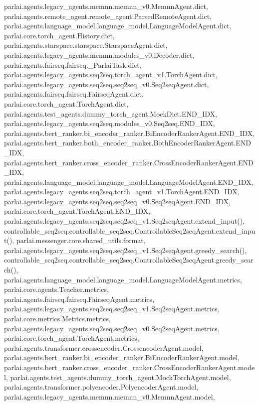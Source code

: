 parlai.\+agents.\+legacy\+\_\+agents.\+memnn.\+memnn\+\_\+v0.\+Memnn\+Agent.\+dict, parlai.\+agents.\+remote\+\_\+agent.\+remote\+\_\+agent.\+Parsed\+Remote\+Agent.\+dict, parlai.\+agents.\+language\+\_\+model.\+language\+\_\+model.\+Language\+Model\+Agent.\+dict, parlai.\+core.\+torch\+\_\+agent.\+History.\+dict, parlai.\+agents.\+starspace.\+starspace.\+Starspace\+Agent.\+dict, parlai.\+agents.\+legacy\+\_\+agents.\+memnn.\+modules\+\_\+v0.\+Decoder.\+dict, parlai.\+agents.\+fairseq.\+fairseq.\+\_\+\+Parlai\+Task.\+dict, parlai.\+agents.\+legacy\+\_\+agents.\+seq2seq.\+torch\+\_\+agent\+\_\+v1.\+Torch\+Agent.\+dict, parlai.\+agents.\+legacy\+\_\+agents.\+seq2seq.\+seq2seq\+\_\+v0.\+Seq2seq\+Agent.\+dict, parlai.\+agents.\+fairseq.\+fairseq.\+Fairseq\+Agent.\+dict, parlai.\+core.\+torch\+\_\+agent.\+Torch\+Agent.\+dict, parlai.\+agents.\+test\+\_\+agents.\+dummy\+\_\+torch\+\_\+agent.\+Mock\+Dict.\+E\+N\+D\+\_\+\+I\+DX, parlai.\+agents.\+legacy\+\_\+agents.\+seq2seq.\+modules\+\_\+v0.\+Seq2seq.\+E\+N\+D\+\_\+\+I\+DX, parlai.\+agents.\+bert\+\_\+ranker.\+bi\+\_\+encoder\+\_\+ranker.\+Bi\+Encoder\+Ranker\+Agent.\+E\+N\+D\+\_\+\+I\+DX, parlai.\+agents.\+bert\+\_\+ranker.\+both\+\_\+encoder\+\_\+ranker.\+Both\+Encoder\+Ranker\+Agent.\+E\+N\+D\+\_\+\+I\+DX, parlai.\+agents.\+bert\+\_\+ranker.\+cross\+\_\+encoder\+\_\+ranker.\+Cross\+Encoder\+Ranker\+Agent.\+E\+N\+D\+\_\+\+I\+DX, parlai.\+agents.\+language\+\_\+model.\+language\+\_\+model.\+Language\+Model\+Agent.\+E\+N\+D\+\_\+\+I\+DX, parlai.\+agents.\+legacy\+\_\+agents.\+seq2seq.\+torch\+\_\+agent\+\_\+v1.\+Torch\+Agent.\+E\+N\+D\+\_\+\+I\+DX, parlai.\+agents.\+legacy\+\_\+agents.\+seq2seq.\+seq2seq\+\_\+v0.\+Seq2seq\+Agent.\+E\+N\+D\+\_\+\+I\+DX, parlai.\+core.\+torch\+\_\+agent.\+Torch\+Agent.\+E\+N\+D\+\_\+\+I\+DX, parlai.\+agents.\+legacy\+\_\+agents.\+seq2seq.\+seq2seq\+\_\+v1.\+Seq2seq\+Agent.\+extend\+\_\+input(), controllable\+\_\+seq2seq.\+controllable\+\_\+seq2seq.\+Controllable\+Seq2seq\+Agent.\+extend\+\_\+input(), parlai.\+messenger.\+core.\+shared\+\_\+utils.\+format, parlai.\+agents.\+legacy\+\_\+agents.\+seq2seq.\+seq2seq\+\_\+v1.\+Seq2seq\+Agent.\+greedy\+\_\+search(), controllable\+\_\+seq2seq.\+controllable\+\_\+seq2seq.\+Controllable\+Seq2seq\+Agent.\+greedy\+\_\+search(), parlai.\+agents.\+language\+\_\+model.\+language\+\_\+model.\+Language\+Model\+Agent.\+metrics, parlai.\+core.\+agents.\+Teacher.\+metrics, parlai.\+agents.\+fairseq.\+fairseq.\+Fairseq\+Agent.\+metrics, parlai.\+agents.\+legacy\+\_\+agents.\+seq2seq.\+seq2seq\+\_\+v1.\+Seq2seq\+Agent.\+metrics, parlai.\+core.\+metrics.\+Metrics.\+metrics, parlai.\+agents.\+legacy\+\_\+agents.\+seq2seq.\+seq2seq\+\_\+v0.\+Seq2seq\+Agent.\+metrics, parlai.\+core.\+torch\+\_\+agent.\+Torch\+Agent.\+metrics, parlai.\+agents.\+transformer.\+crossencoder.\+Crossencoder\+Agent.\+model, parlai.\+agents.\+bert\+\_\+ranker.\+bi\+\_\+encoder\+\_\+ranker.\+Bi\+Encoder\+Ranker\+Agent.\+model, parlai.\+agents.\+bert\+\_\+ranker.\+cross\+\_\+encoder\+\_\+ranker.\+Cross\+Encoder\+Ranker\+Agent.\+model, parlai.\+agents.\+test\+\_\+agents.\+dummy\+\_\+torch\+\_\+agent.\+Mock\+Torch\+Agent.\+model, parlai.\+agents.\+transformer.\+polyencoder.\+Polyencoder\+Agent.\+model, parlai.\+agents.\+legacy\+\_\+agents.\+memnn.\+memnn\+\_\+v0.\+Memnn\+Agent.\+model, 